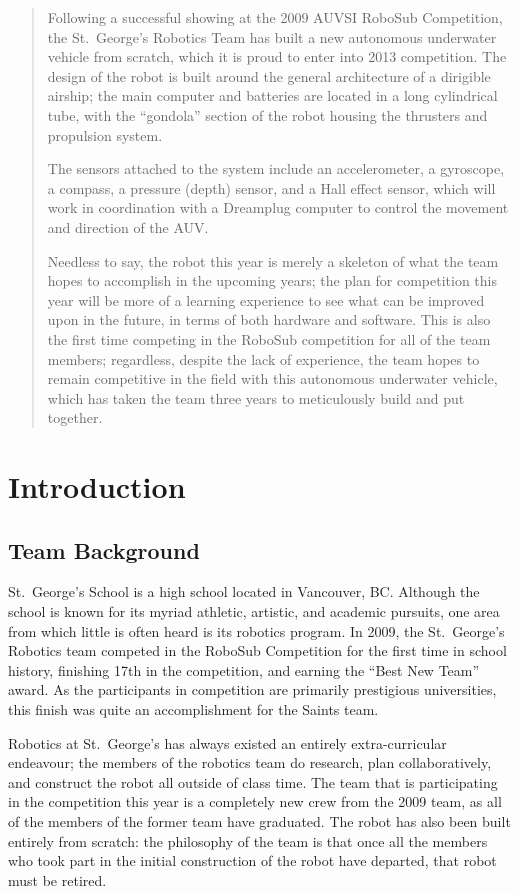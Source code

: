 \documentclass[12pt, letterpaper, twocolumn, titlepage]{article}
\begin{document}
\begin{abstract}
Following a successful showing at the 2009 AUVSI RoboSub Competition, the St.\ George's Robotics Team has built a new autonomous underwater vehicle from scratch, which it is proud to enter into 2013 competition. The design of the robot is built around the general architecture of a dirigible airship; the main computer and batteries are located in a long cylindrical tube, with the ``gondola'' section of the robot housing the thrusters and propulsion system.

The sensors attached to the system include an accelerometer, a gyroscope, a compass, a pressure (depth) sensor, and a Hall effect sensor, which will work in coordination with a Dreamplug computer to control the movement and direction of the AUV.

Needless to say, the robot this year is merely a skeleton of what the team hopes to accomplish in the upcoming years; the plan for competition this year will be more of a learning experience to see what can be improved upon in the future, in terms of both hardware and software. This is also the first time competing in the RoboSub competition for all of the team members; regardless, despite the lack of experience, the team hopes to remain competitive in the field with this autonomous underwater vehicle, which has taken the team three years to meticulously build and put together.
\end{abstract}


\section{Introduction}

\subsection{Team Background}
St.~George's School is a high school located in Vancouver, BC. Although the school is known for its myriad athletic, artistic, and academic pursuits, one area from which little is often heard is its robotics program. In 2009, the St.~George's Robotics team competed in the RoboSub Competition for the first time in school history, finishing 17th in the competition, and earning the ``Best New Team'' award. As the participants in competition are primarily prestigious universities, this finish was quite an accomplishment for the Saints team.

Robotics at St.~George's has always existed an entirely extra-curricular endeavour; the members of the robotics team do research, plan collaboratively, and construct the robot all outside of class time. The team that is participating in the competition this year is a completely new crew from the 2009 team, as all of the members of the former team have graduated. The robot has also been built entirely from scratch: the philosophy of the team is that once all the members who took part in the initial construction of the robot have departed, that robot must be retired.
\end{document}
